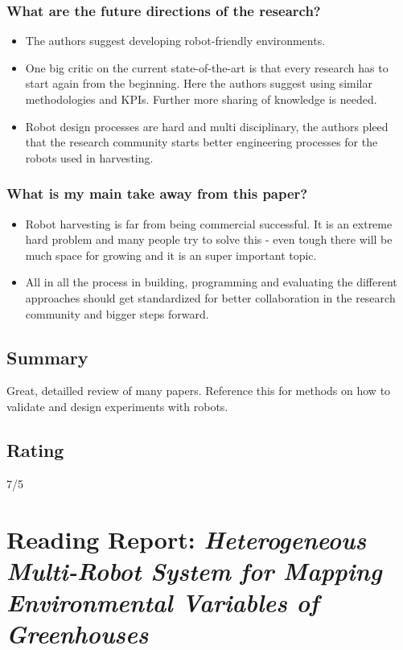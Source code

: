 \subsubsection*{What are the future directions of the research?}
\begin{itemize}
    \item The authors suggest developing robot-friendly environments.
    \item One big critic on the current state-of-the-art is that every research has to start again from the beginning. Here the authors suggest using similar methodologies and KPIs. Further more sharing of knowledge is needed.
    \item Robot design processes are hard and multi disciplinary, the authors pleed that the research community starts better engineering processes for the robots used in harvesting. 
\end{itemize}
\subsubsection*{What is my main take away from this paper?}
\begin{itemize}
    \item Robot harvesting is far from being commercial successful. It is an extreme hard problem and many people try to solve this - even tough there will be much space for growing and it is an super important topic.
    \item All in all the process in building, programming and evaluating the different approaches should get standardized for better collaboration in the research community and bigger steps forward.
\end{itemize}

\subsection*{Summary}
Great, detailled review of many papers. Reference this for methods on how to validate and design experiments with robots.
\subsection*{Rating}
7/5




\section{Reading Report: \emph{Heterogeneous Multi-Robot System for Mapping Environmental Variables of Greenhouses}}
\cite{Roldan2016}


